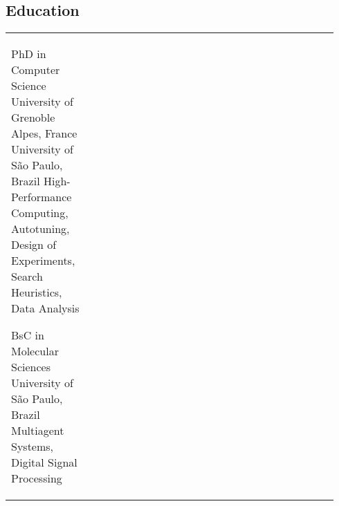 \documentclass[a4paper,10pt]{article}
\begin{document}
\begin{paracol}{2}
\smallskip %

\section{Education}
\label{sec:org539e8d5}
\begin{supertabular}{R{0.24\linewidth}L{0.7\linewidth}}
    {PhD in Computer Science}
    {University of Grenoble Alpes, France}
    {University of São Paulo, Brazil}
    {High-Performance Computing, Autotuning, Design of Experiments, Search
    Heuristics, Data Analysis}

    {BsC in Molecular Sciences}
    {}
    {University of São Paulo, Brazil}
    {Multiagent Systems, Digital Signal Processing}

\end{supertabular}

\end{paracol}
\end{document}
